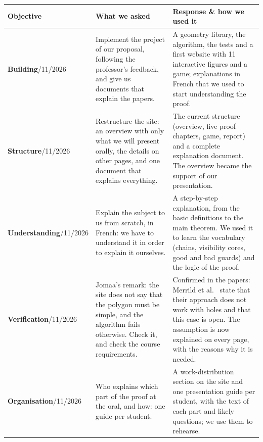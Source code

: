 \documentclass[11pt,a4paper]{article}
\begin{document}
{\small
\begin{longtable}{@{}L{2.7cm} L{5.8cm} L{7.2cm}@{}}
\toprule
Objective & What we asked & Response \& how we used it \\
\midrule
\endhead

\textbf{Building}/11/2026 &
Implement the project of our proposal, following the professor's feedback, and give us documents that explain the papers. &
A geometry library, the algorithm, the tests and a first website with 11 interactive figures and a game; explanations in French that we used to start
understanding the proof. \\

\textbf{Structure}/11/2026 &
Restructure the site: an overview with only what we will present orally, the details on other pages, and one document that explains everything. &
The current structure (overview, five proof chapters, game, report) and a complete explanation document. The overview became the support of our
presentation. \\

\textbf{Understanding}/11/2026 &
Explain the subject to us from scratch, in French: we have to understand it in order to explain it ourselves. &
A step-by-step explanation, from the basic definitions to the main theorem. We used it to learn the vocabulary (chains, visibility cores, good and bad
guards) and the logic of the proof. \\

\textbf{Verification}/11/2026 &
Jomaa's remark: the site does not say that the polygon must be simple, and the algorithm fails otherwise. Check it, and check the course requirements. &
Confirmed in the papers: Merrild et al.~\cite{Merrild2024} state that their approach does not work with holes and that this case is open. The assumption
is now explained on every page, with the reasons why it is needed. \\

\textbf{Organisation}/11/2026 &
Who explains which part of the proof at the oral, and how: one guide per student. &
A work-distribution section on the site and one presentation guide per student, with the text of each part and likely questions; we use them to
rehearse. \\


\end{longtable}}
\end{document}
